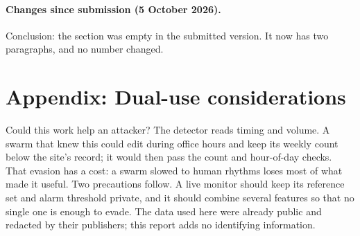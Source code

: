 \documentclass[10pt,a4paper]{article}
\begin{document}
\paragraph{Changes since submission (5 October 2026).} 
Conclusion: the section was empty in the submitted version. It now has two paragraphs, and no number changed.




\appendix
\section*{Appendix: Dual-use considerations}
Could this work help an attacker? The detector reads timing and volume. A swarm that knew this could edit during office hours and keep its weekly count below the site's record; it would then pass the count and hour-of-day checks. That evasion has a cost: a swarm slowed to human rhythms loses most of what made it useful. Two precautions follow. A live monitor should keep its reference set and alarm threshold private, and it should combine several features so that no single one is enough to evade. The data used here were already public and redacted by their publishers; this report adds no identifying information.
\end{document}
